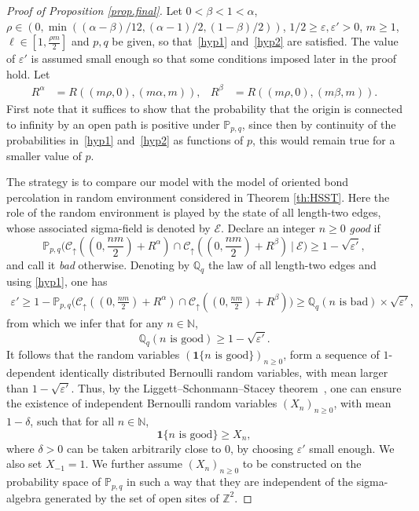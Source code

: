 \documentclass[pdflatex,sn-mathphys-num]{sn-jnl}%
\newcommand{\cC}{\ensuremath{\mathcal C}}
\newcommand{\bbN}{{\ensuremath{\mathbb N}} }
\newcommand{\bbP}{{\ensuremath{\mathbb P}} }
\newcommand{\bbZ}{{\ensuremath{\mathbb Z}} }
\newcommand{\1}{{\ensuremath{\mathbf{1}}} }
\theoremstyle{thmstyleone}%
\theoremstyle{thmstyletwo}%
\theoremstyle{thmstylethree}%
\begin{document}
\begin{proof}[Proof of Proposition \ref{prop.final}] 
Let $0<\beta<1<\alpha$, $\rho\in(0,\min((\alpha-\beta)/12,(\alpha-1)/2,(1-\beta)/2))$, $1/2\ge\varepsilon,\varepsilon'>0$, $m\ge 1$, $\ell \in [1,\tfrac{\rho m}{2}]$ and $p,q$ be given, so that~\eqref{hyp1} and~\eqref{hyp2} are satisfied. The value of $\varepsilon'$ is assumed small enough so that some conditions imposed later in the proof hold. Let 
\begin{align}
\label{eq:def:RaRb}
R^\alpha&{}=R((m\rho,0),(m\alpha,m)),&R^\beta&{}=R((m\rho,0),(m\beta,m)).
\end{align}
First note that it suffices to show that the probability that the origin is connected to infinity by an open path is positive under $\mathbb P_{p,q}$, since then by continuity of the probabilities in~\eqref{hyp1} and~\eqref{hyp2} as functions of $p$, this would remain true for a smaller value of $p$. 

The strategy is to compare our model with the model of oriented bond percolation in random environment 
considered in Theorem \ref{th:HSST}. 
Here the role of the random environment is played by the state of all length-two edges, whose associated sigma-field 
is denoted by $\mathcal E$. Declare an integer $n\ge 0$ \emph{good} if 
\begin{equation}\label{good.integer}
\bbP_{p,q}\Big(\cC_\uparrow((0, \frac{nm}2)+ R^\alpha)\cap\cC_\uparrow((0,\frac{nm}2) + R^\beta)\ \Big| \ \mathcal E \Big)\ge 1-\sqrt{\varepsilon'},
\end{equation}
and call it \emph{bad} otherwise. Denoting by $\mathbb Q_q$ the law of all length-two edges and using \eqref{hyp1}, one has 
\begin{align*}
\varepsilon'  \ge 1-\mathbb P_{p,q}\Big(\cC_\uparrow((0, \frac{nm}2)+ R^\alpha)\cap\cC_\uparrow((0,\frac{nm}2) + R^\beta)\Big) \ge \mathbb Q_q(n \text{ is bad})\times \sqrt{\varepsilon'},  
\end{align*} 
from which we infer that for any $n\in\bbN$,  
\[\mathbb Q_q(n \text{ is good})\ge 1 -  \sqrt{\varepsilon'}.\]
It follows that the random variables $(\1\{n\text{ is good}\})_{n\ge 0}$, form a sequence of $1$-dependent identically distributed Bernoulli random variables, with mean larger than $1- \sqrt{\varepsilon'}$. Thus, by the Liggett--Schonmann--Stacey theorem~\cite[Theorem~0.0]{Liggett97}, one can ensure the existence of independent Bernoulli random variables $(X_n)_{n\ge 0}$, with mean $1-\delta$, such that for all $n\in\bbN$,
\[\1\{n\text{ is good}\} \ge X_n,\]
where $\delta>0$ can be taken arbitrarily close to $0$, by choosing $\varepsilon'$ small enough. We also set $X_{-1} = 1$. We further assume $(X_n)_{n\ge 0}$ to be constructed on the probability space of $\bbP_{p,q}$ in such a way that they are independent of the sigma-algebra generated by the set of open sites of $\bbZ^2$.


\end{proof}
\end{document}
